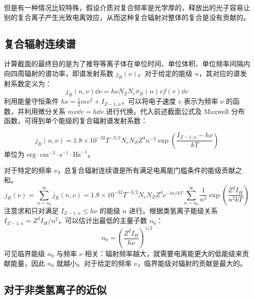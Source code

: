 但是有一种情况比较特殊，假设介质对复合频率是光学厚的，释放出的光子容易让别的复合离子产生光致电离效应，从而这种复合辐射对整体的复合是没有贡献的。

\subsection{复合辐射连续谱}

计算截面的最终目的是为了推导等离子体在单位时间、单位体积、单位频率间隔内向四周辐射的谱功率，即谱发射系数 $j_R(\nu)$。对于给定的能级 $n$，其对应的谱发射系数定义为：
\begin{equation}
    j_R(n, \nu) \dd \nu = h\nu N_Z N_e \sigma_R(n) v f(v) \dd v \nonumber
\end{equation}
利用能量守恒条件 $h\nu = \frac{1}{2}mv^2 + I_{Z-1, n}$，可以将电子速度 $v$ 表示为频率 $\nu$ 的函数，并利用微分关系 $mv \dd v = h \dd \nu$ 进行代换。代入前述截面公式及 Maxwell 分布函数，可得到单个能级的复合辐射谱发射系数：

\begin{equation}\label{eq:j_R_n}
    j_R(n, \nu) = 1.8 \times 10^{-32} T^{-3/2} N_e N_Z Z^4 n^{-3} \exp \left( \frac{I_{Z-1,n} - h\nu}{kT} \right)
\end{equation}
单位为 $\text{erg} \cdot \text{cm}^{-3} \cdot \text{s}^{-1} \cdot \text{Hz}^{-1}$。

对于特定的频率 $\nu$，总复合辐射连续谱是所有满足电离能门槛条件的能级贡献之和。
\begin{equation}
    j_R(\nu) = \sum_{n=n_0}^{\infty} j_R(n, \nu) = 1.8 \times 10^{-32} T^{-3/2} N_e N_Z Z^4 e^{-h\nu / kT} \sum_{n=n_0}^{\infty} \frac{1}{n^3} \exp \left( \frac{Z^2 I_H}{n^2 kT} \right)
\end{equation}
注意求和只对满足 $I_{Z-1, n} \le h\nu$ 的能级 $n$ 进行。根据类氢离子能级关系 $I_{Z-1, n} = Z^2 I_H / n^2$，可以估计出最低的主量子数 $n_0$：
\begin{equation}
    n_0 = \left( \frac{Z^2 I_H}{h\nu} \right)^{1/2} \nonumber
\end{equation}
可见临界能级 $n_0$ 与频率 $\nu$ 相关：辐射频率越大，就需要电离能更大的低能级来贡献能量，因此 $n_0$ 就越小。对于给定的频率 $\nu$，临界能级对辐射的贡献是最大的。


\subsection{对于非类氢离子的近似}

